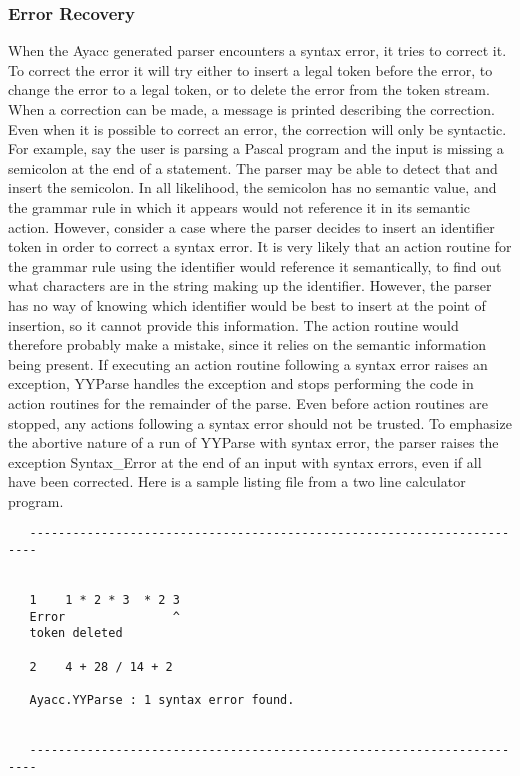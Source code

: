 \subsubsection{Error Recovery}
When the Ayacc generated parser encounters a syntax error, it tries to
correct it. To correct the error it will try either to insert a legal
token before the error, to change the error to a legal token, or to
delete the error from the token stream. When a correction can be made,
a message is printed describing the correction. Even when it is
possible to correct an error, the correction will only be syntactic.
For example, say the user is parsing a Pascal program and the input is
missing a semicolon at the end of a statement. The parser may be able
to detect that and insert the semicolon. In all likelihood, the
semicolon has no semantic value, and the grammar rule in which it
appears would not reference it in its semantic action. However,
consider a case where the parser decides to insert an identifier token
in order to correct a syntax error. It is very likely that an action
routine for the grammar rule using the identifier would reference it
semantically, to find out what characters are in the string making up
the identifier. However, the parser has no way of knowing which
identifier would be best to insert at the point of insertion, so it
cannot provide this information. The action routine would therefore
probably make a mistake, since it relies on the semantic information
being present. If executing an action routine following a syntax error
raises an exception, YYParse handles the exception and stops
performing the code in action routines for the remainder of the parse.
Even before action routines are stopped, any actions following a
syntax error should not be trusted. To emphasize the abortive nature
of a run of YYParse with syntax error, the parser raises the exception
Syntax\_Error at the end of an input with syntax errors, even if all
have been corrected. Here is a sample listing file from a two line
calculator program.

\begin{verbatim}
   -----------------------------------------------------------------------


   1    1 * 2 * 3  * 2 3
   Error               ^
   token deleted

   2    4 + 28 / 14 + 2

   Ayacc.YYParse : 1 syntax error found.

  
   -----------------------------------------------------------------------
\end{verbatim}

